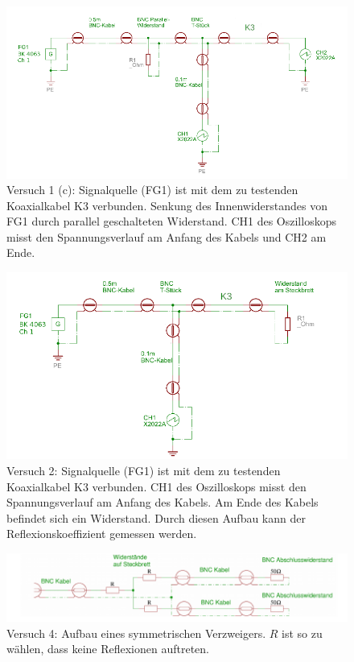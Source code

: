\documentclass{article}
\begin{document}
\begin{figure}[H]
\centering
\caption{Versuch 1 (c): Signalquelle (FG1) ist mit dem zu testenden Koaxialkabel K3 verbunden. Senkung des Innenwiderstandes von FG1 durch parallel geschalteten Widerstand. CH1 des Oszilloskops misst den Spannungsverlauf am Anfang des Kabels und CH2 am Ende.}
\label{fig:anordnung_task1c}
\includegraphics[scale=2]{task1c.png}
\end{figure}



\begin{figure}[H]
\centering
\caption{Versuch 2: Signalquelle (FG1) ist mit dem zu testenden Koaxialkabel K3 verbunden. CH1 des Oszilloskops misst den Spannungsverlauf am Anfang des Kabels. Am Ende des Kabels befindet sich ein Widerstand. Durch diesen Aufbau kann der Reflexionskoeffizient gemessen werden.}
\label{fig:anordnung_task2}
\includegraphics[scale=2]{task2.png}
\end{figure}


\begin{figure}[H]
\centering
\caption{Versuch 4: Aufbau eines symmetrischen Verzweigers. $R$ ist so zu wählen, dass keine Reflexionen auftreten.}
\label{fig:anordnung_task4}
\includegraphics[scale=2]{task4.png}
\end{figure}
\end{document}
